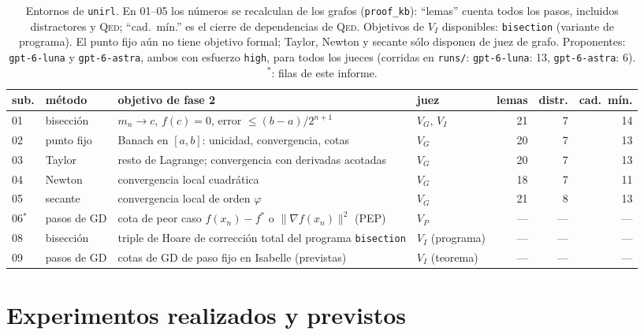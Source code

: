 \documentclass[11pt,a4paper]{article}
\begin{document}
\begin{table}[!ht]
\centering
\footnotesize
\begin{tabular}{@{}llp{5.0cm}lrrr@{}}
\toprule
sub. & método & objetivo de fase 2 & juez & lemas & distr. & cad.\ mín. \\
\midrule
01 & bisección & $m_n \to c$, $f(c)=0$, error $\le (b-a)/2^{n+1}$ & $V_G$, $V_I$ & 21 & 7 & 14 \\
02 & punto fijo & Banach en $[a,b]$: unicidad, convergencia, cotas & $V_G$ & 20 & 7 & 13 \\
03 & Taylor & resto de Lagrange; convergencia con derivadas acotadas & $V_G$ & 20 & 7 & 13 \\
04 & Newton & convergencia local cuadrática & $V_G$ & 18 & 7 & 11 \\
05 & secante & convergencia local de orden $\varphi$ & $V_G$ & 21 & 8 & 13 \\
06$^\ast$ & pasos de GD & cota de peor caso $f(x_n)-f^*$ o $\|\nabla f(x_n)\|^2$ (PEP) & $V_P$ & --- & --- & --- \\
08 & bisección & triple de Hoare de corrección total del programa \texttt{bisection} & $V_I$ (programa) & --- & --- & --- \\
09 & pasos de GD & cotas de GD de paso fijo en Isabelle (previstas) & $V_I$ (teorema) & --- & --- & --- \\
\bottomrule
\end{tabular}
\caption{Entornos de \texttt{unirl}. En 01--05 los números se recalculan de los grafos (\texttt{proof\_kb}): ``lemas'' cuenta todos los pasos, incluidos distractores y \textsc{Qed}; ``cad.\ mín.'' es el cierre de dependencias de \textsc{Qed}. Objetivos de $V_I$ disponibles: \texttt{bisection} (variante de programa). El punto fijo aún no tiene objetivo formal; Taylor, Newton y secante sólo disponen de juez de grafo. Proponentes: \texttt{gpt-6-luna} y \texttt{gpt-6-astra}, ambos con esfuerzo \texttt{high}, para todos los jueces (corridas en \texttt{runs/}: \texttt{gpt-\allowbreak{}6-\allowbreak{}luna}: 13, \texttt{gpt-\allowbreak{}6-\allowbreak{}astra}: 6). $^\ast$: filas de este informe.}
\label{tab:envs}
\end{table}

\section{Experimentos realizados y previstos}
\end{document}
